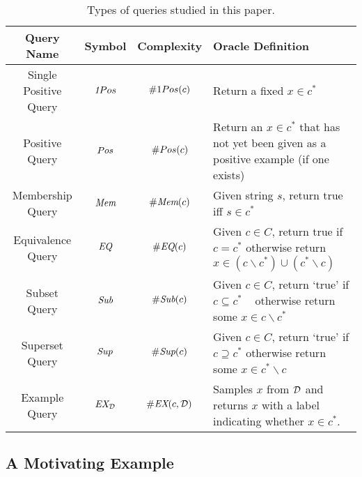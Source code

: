 \begin{table}
\label{table:queries}
\begin{center}
  \begin{tabularx}{\textwidth}{| c | c | c | X | }
    \hline
    Query Name & Symbol & Complexity & Oracle Definition \\ \hline
    Single Positive Query & $\emph{1}Pos$ & $\oneposC(c)$ & Return a fixed $x \in c^*$ \\ \hline
    Positive Query & $Pos$ & $\#Pos(c)$ & Return an $x\in c^*$ that has not yet been given as a positive example (if one exists)\\ \hline
    Membership Query & $\emph{Mem}$ & $\#\emph{Mem}(c)$ & Given string $s$, return true iff $s \in c^*$ \\ \hline
    Equivalence Query & $\emph{EQ}$ & $\#\emph{EQ}(c)$ & Given $c \in C$, return true if $c=c^*$ otherwise return $x \in (c \backslash c^*) \cup (c^* \backslash c)$\\ \hline 
    Subset Query & $\emph{Sub}$ & $\#\emph{Sub}(c)$ & Given $c \in C$, return `true' if $c \subseteq c^*$ \mbox{  } otherwise return some $x \in c \backslash c^*$ \\ \hline
    Superset Query & $\emph{Sup}$ & $\#\emph{Sup}(c)$ & Given $c \in C$, return `true' if $c \supseteq c^*$  otherwise return some $x \in c^* \backslash c$\\ \hline
    Example Query & $\emph{EX}_{\mathcal{D}}$ & $\#\emph{EX}(c, \mathcal{D})$ & Samples $x$ from $\mathcal{D}$ and returns $x$ with a label indicating whether $x \in c^*$. \\ \hline
  \end{tabularx}
\end{center}
\caption{Types of queries studied in this paper.}
\end{table}

\subsection{A Motivating Example}


